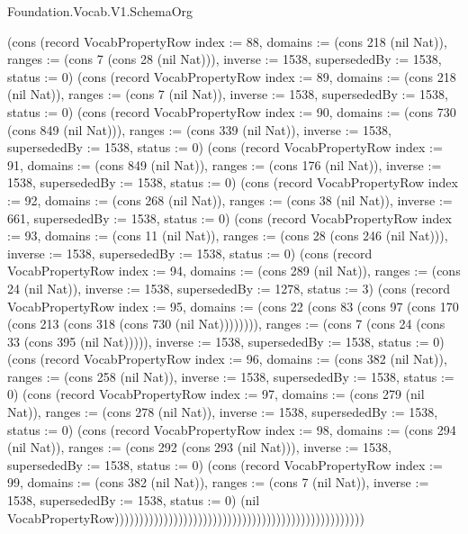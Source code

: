 \begin{lexlean}{Foundation.Vocab.V1.SchemaOrg}
\begin{semanticmodule}
{(cons (record VocabPropertyRow {index := 88, domains := (cons 218 (nil Nat)), ranges := (cons 7 (cons 28 (nil Nat))), inverse := 1538, supersededBy := 1538, status := 0}) (cons (record VocabPropertyRow {index := 89, domains := (cons 218 (nil Nat)), ranges := (cons 7 (nil Nat)), inverse := 1538, supersededBy := 1538, status := 0}) (cons (record VocabPropertyRow {index := 90, domains := (cons 730 (cons 849 (nil Nat))), ranges := (cons 339 (nil Nat)), inverse := 1538, supersededBy := 1538, status := 0}) (cons (record VocabPropertyRow {index := 91, domains := (cons 849 (nil Nat)), ranges := (cons 176 (nil Nat)), inverse := 1538, supersededBy := 1538, status := 0}) (cons (record VocabPropertyRow {index := 92, domains := (cons 268 (nil Nat)), ranges := (cons 38 (nil Nat)), inverse := 661, supersededBy := 1538, status := 0}) (cons (record VocabPropertyRow {index := 93, domains := (cons 11 (nil Nat)), ranges := (cons 28 (cons 246 (nil Nat))), inverse := 1538, supersededBy := 1538, status := 0}) (cons (record VocabPropertyRow {index := 94, domains := (cons 289 (nil Nat)), ranges := (cons 24 (nil Nat)), inverse := 1538, supersededBy := 1278, status := 3}) (cons (record VocabPropertyRow {index := 95, domains := (cons 22 (cons 83 (cons 97 (cons 170 (cons 213 (cons 318 (cons 730 (nil Nat)))))))), ranges := (cons 7 (cons 24 (cons 33 (cons 395 (nil Nat))))), inverse := 1538, supersededBy := 1538, status := 0}) (cons (record VocabPropertyRow {index := 96, domains := (cons 382 (nil Nat)), ranges := (cons 258 (nil Nat)), inverse := 1538, supersededBy := 1538, status := 0}) (cons (record VocabPropertyRow {index := 97, domains := (cons 279 (nil Nat)), ranges := (cons 278 (nil Nat)), inverse := 1538, supersededBy := 1538, status := 0}) (cons (record VocabPropertyRow {index := 98, domains := (cons 294 (nil Nat)), ranges := (cons 292 (cons 293 (nil Nat))), inverse := 1538, supersededBy := 1538, status := 0}) (cons (record VocabPropertyRow {index := 99, domains := (cons 382 (nil Nat)), ranges := (cons 7 (nil Nat)), inverse := 1538, supersededBy := 1538, status := 0}) (nil VocabPropertyRow)))))))))))))))))))))))))))))))))))))))))))))))))))
}


\end{semanticmodule}
\end{lexlean}
